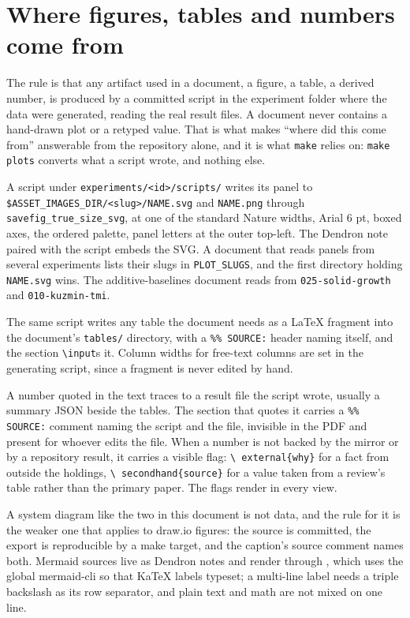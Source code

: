 
\section{Where figures, tables and numbers come from}
\label{sec:provenance}

The rule is that any artifact used in a document, a figure, a table, a derived
number, is produced by a committed script in the experiment folder where the data
were generated, reading the real result files. A document never contains a
hand-drawn plot or a retyped value. That is what makes ``where did this come from''
answerable from the repository alone, and it is what \texttt{make} relies on:
\texttt{make plots} converts what a script wrote, and nothing else.

A script under \texttt{experiments/<id>/scripts/} writes its panel to
\texttt{\$ASSET\_IMAGES\_DIR/<slug>/NAME.svg} and \texttt{NAME.png} through
\texttt{savefig\_true\_size\_svg}, at one of the standard Nature widths, Arial 6 pt,
boxed axes, the ordered palette, panel letters at the outer top-left. The Dendron
note paired with the script embeds the SVG. A document that reads panels from
several experiments lists their slugs in \texttt{PLOT\_SLUGS}, and the first
directory holding \texttt{NAME.svg} wins. The additive-baselines document reads
from \texttt{025-solid-growth} and \texttt{010-kuzmin-tmi}.

The same script writes any table the document needs as a LaTeX fragment into the
document's \texttt{tables/} directory, with a \texttt{\%\% SOURCE:} header naming
itself, and the section \texttt{\textbackslash input}s it. Column widths for
free-text columns are set in the generating script, since a fragment is never
edited by hand.

A number quoted in the text traces to a result file the script wrote, usually a
summary JSON beside the tables. The section that quotes it carries a
\texttt{\%\% SOURCE:} comment naming the script and the file, invisible in the PDF
and present for whoever edits the file. When a number is not backed by the mirror
or by a repository result, it carries a visible flag: \texttt{\textbackslash
external\{why\}} for a fact from outside the holdings, \texttt{\textbackslash
secondhand\{source\}} for a value taken from a review's table rather than the
primary paper. The flags render in every view.

A system diagram like the two in this document is not data, and the rule for it is
the weaker one that applies to draw.io figures: the source is committed, the export
is reproducible by a make target, and the caption's source comment names both.
Mermaid sources live as Dendron notes and render through
, which uses the global
mermaid-cli so that KaTeX labels typeset; a multi-line label needs a triple
backslash as its row separator, and plain text and math are not mixed on one line.
